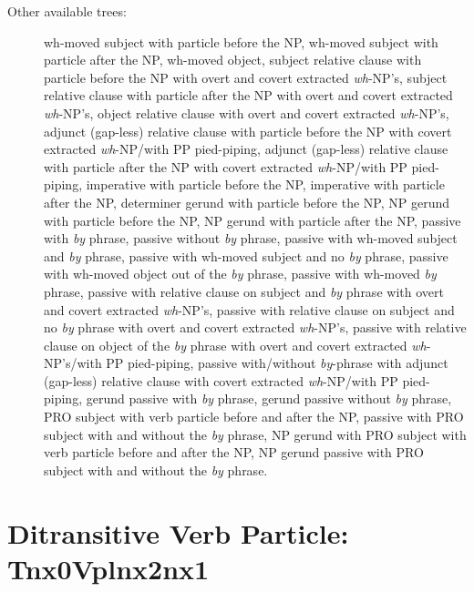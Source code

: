 \begin{description}
\item[Other available trees:] wh-moved subject with particle before the NP,
wh-moved subject with particle after the NP, wh-moved object, subject
relative clause with particle before the NP with overt and covert extracted
{\it wh}-NP's, subject relative clause with particle after the NP with
overt and covert extracted {\it wh}-NP's, object relative clause with overt
and covert extracted {\it wh}-NP's, adjunct (gap-less) relative clause with
particle before the NP with covert extracted {\it wh}-NP/with PP
pied-piping, adjunct (gap-less) relative clause with particle after the NP
with covert extracted {\it wh}-NP/with PP pied-piping, imperative with
particle before the NP, imperative with particle after the NP, determiner
gerund with particle before the NP, NP gerund with particle before the NP,
NP gerund with particle after the NP, passive with {\it by} phrase, passive
without {\it by} phrase, passive with wh-moved subject and {\it by} phrase,
passive with wh-moved subject and no {\it by} phrase, passive with wh-moved
object out of the {\it by} phrase, passive with wh-moved {\it by} phrase,
passive with relative clause on subject and {\it by} phrase with overt and
covert extracted {\it wh}-NP's, passive with relative clause on subject and
no {\it by} phrase with overt and covert extracted {\it wh}-NP's, passive
with relative clause on object of the {\it by} phrase with overt and covert
extracted {\it wh}-NP's/with PP pied-piping, passive with/without {\it
by}-phrase with adjunct (gap-less) relative clause with covert extracted
{\it wh}-NP/with PP pied-piping, gerund passive with {\it by} phrase,
gerund passive without {\it by} phrase, PRO subject with verb particle
before and after the NP, passive with PRO subject with and without the {\it
by} phrase, NP gerund with PRO subject with verb particle before and after
the NP, NP gerund passive with PRO subject with and without the {\it by}
phrase.

\end{description}

\section{Ditransitive Verb Particle: Tnx0Vplnx2nx1}
\label{nx0Vplnx1nx2}

